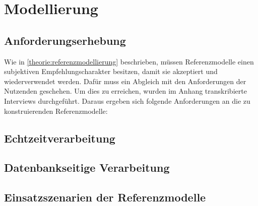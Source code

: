\chapter{Modellierung}
\section{Anforderungserhebung}
Wie in \autoref{theorie:referenzmodellierung} beschrieben, müssen Referenzmodelle einen subjektiven Empfehlungscharakter besitzen, damit sie akzeptiert und wiederverwendet werden. Dafür muss ein Abgleich mit den Anforderungen der Nutzenden geschehen. Um dies zu erreichen, wurden im Anhang transkribierte Interviews  durchgeführt. Daraus ergeben sich folgende Anforderungen an die zu konstruierenden Referenzmodelle:
\section{Echtzeitverarbeitung}

\section{Datenbankseitige Verarbeitung}

\section{Einsatzszenarien der Referenzmodelle}